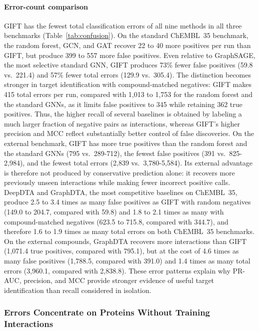 \documentclass[11pt,letterpaper]{article}
\begin{document}
\paragraph{Error-count comparison}
GIFT has the fewest total classification errors of all nine methods in all three benchmarks (Table~\ref{tab:confusion}). On the standard ChEMBL~35 benchmark, the random forest, GCN, and GAT recover 22 to 40 more positives per run than GIFT, but produce 399 to 557 more false positives. Even relative to GraphSAGE, the most selective standard GNN, GIFT produces 73\% fewer false positives (59.8 vs.\ 221.4) and 57\% fewer total errors (129.9 vs.\ 305.4). The distinction becomes stronger in target identification with compound-matched negatives: GIFT makes 415 total errors per run, compared with 1,013 to 1,753 for the random forest and the standard GNNs, as it limits false positives to 345 while retaining 362 true positives. Thus, the higher recall of several baselines is obtained by labeling a much larger fraction of negative pairs as interactions, whereas GIFT's higher precision and MCC reflect substantially better control of false discoveries. On the external benchmark, GIFT has more true positives than the random forest and the standard GNNs (795 vs.\ 289-712), the fewest false positives (391 vs.\ 825-2,984), and the fewest total errors (2,839 vs.\ 3,780-5,584). Its external advantage is therefore not produced by conservative prediction alone: it recovers more previously unseen interactions while making fewer incorrect positive calls. DeepDTA and GraphDTA, the most competitive baselines on ChEMBL~35, produce 2.5 to 3.4 times as many false positives as GIFT with random negatives (149.0 to 204.7, compared with 59.8) and 1.8 to 2.1 times as many with compound-matched negatives (623.5 to 715.8, compared with 344.7), and therefore 1.6 to 1.9 times as many total errors on both ChEMBL~35 benchmarks. On the external compounds, GraphDTA recovers more interactions than GIFT (1,071.4 true positives, compared with 795.1), but at the cost of 4.6 times as many false positives (1,788.5, compared with 391.0) and 1.4 times as many total errors (3,960.1, compared with 2,838.8). These error patterns explain why PR-AUC, precision, and MCC provide stronger evidence of useful target identification than recall considered in isolation.

\subsubsection{Errors Concentrate on Proteins Without Training Interactions}
\label{sec:misclassification}
\end{document}
